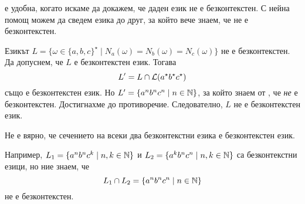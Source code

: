  е удобна, когато искаме да докажем, че даден език не е безконтекстен.
С нейна помощ можем да сведем езика до друг, за който вече знаем, че не е безконтекстен.

\begin{example}
  Езикът $L = \{\omega \in \{a,b,c\}^\star \mid N_a(\omega) = N_b(\omega) = N_c(\omega)\}$ не е безконтекстен.
  Да допуснем, че $L$ е безконтекстен език.
  Тогава \[L^\prime = L \cap \mathcal{L}(a^\star b^\star c^\star)\] също е безконтекстен език.
  Но $L^\prime = \{a^nb^nc^n \mid n \in \mathbb{N}\}$, за който знаем от , че {\em не} е безконтекстен.
  Достигнахме до противоречие. Следователно, $L$ не е безконтекстен език.
\end{example}

\begin{framed}
  \begin{remark}
    Не е вярно, че сечението на всеки два безконтекстни езика е безконтекстен език.

    Например, $L_1 = \{a^nb^nc^k \mid n,k\in\mathbb{N}\}$ и $L_2 = \{a^kb^nc^n \mid n,k\in\mathbb{N}\}$
    са безконтекстни езици, но ние знаем, че
    \[L_1 \cap L_2 = \{a^nb^nc^n \mid n \in \mathbb{N}\}\]
    не е безконтекстен.
  \end{remark}
\end{framed}

